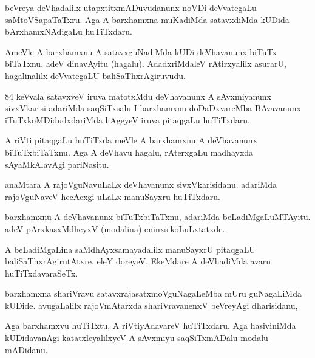\documentclass{article}
\begin{document}
\begin{mn}
beVreya deVhadalilx utapxtitxmADuvudanunx noVDi deVvategaLu
saMtoVSapaTaTxru. Aga A barxhamxna muKadiMda  satavxdiMda kUDida
bArxhamxNAdigaLu huTiTxdaru.
\end{mn}

\begin{mn}
AmeVle A barxhamxnu A satavxguNadiMda kUDi deVhavanunx biTuTx
biTaTxnu. adeV dinavAyitu (hagalu). AdadxriMdaleV rAtirxyalilx
asurarU, hagalinalilx deVvategaLU baliSaThxrAgiruvudu.
\end{mn}

\begin{mn}84
keVvala satavxveV iruva matotxMdu deVhavanunx A sAvxmiyanunx
sivxVkarisi adariMda saqSiTxsalu I barxhamxnu doDaDxvareMba BAvavanunx
iTuTxkoMDidudxdariMda hAgeyeV iruva pitaqgaLu huTiTxdaru.
\end{mn}

\begin{mn}
A riVti pitaqgaLu huTiTxda meVle A barxhamxnu A deVhavanunx
biTuTxbiTaTxnu. Aga A deVhavu hagalu, rAterxgaLu madhayxda
sAyaMkAlavAgi pariNasitu.
\end{mn}

\begin{mn}
anaMtara A rajoVguNavuLaLx deVhavanunx sivxVkarisidanu. adariMda
rajoVguNaveV hecAcxgi uLaLx manuSayxru huTiTxdaru.
\end{mn}

\begin{mn}
barxhamxnu A deVhavanunx biTuTxbiTaTxnu, adariMda
beLadiMgaLuMTAyitu. adeV pArxkasxMdheyxV (modalina) eninxsikoLuLxtatxde.
\end{mn}

\begin{mn}
A beLadiMgaLina saMdhAyxsamayadalilx manuSayxrU pitaqgaLU
baliSaThxrAgirutAtxre. eleY doreyeV, EkeMdare A deVhadiMda avaru huTiTxdavaraSeTx.
\end{mn}

\begin{mn}%
barxhamxna shariVravu satavxrajasatxmoVguNagaLeMba mUru guNagaLiMda
kUDide. avugaLalilx rajoVmAtarxda shariVravanenxV beVreyAgi dharisidanu,
\end{mn}

\begin{mn}
Aga barxhamxvu huTiTxtu, A riVtiyAdavareV huTiTxdaru. Aga hasiviniMda
kUDidavanAgi katatxleyalilxyeV A sAvxmiyu saqSiTxmADalu modalu mADidanu.
\end{mn}
\end{document}
